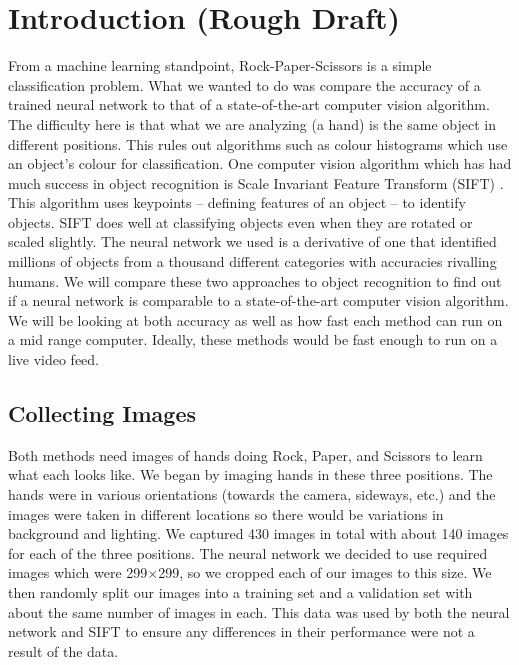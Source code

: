 \section{Introduction (Rough Draft)}

From a machine learning standpoint, Rock-Paper-Scissors is a simple classification problem. What we wanted to do was compare the accuracy of a trained neural network to that of a state-of-the-art computer vision algorithm. The difficulty here is that what we are analyzing (a hand) is the same object in different positions. This rules out algorithms such as colour histograms which use an object's colour for classification. One computer vision algorithm which has had much success in object recognition is Scale Invariant Feature Transform (SIFT) \cite{SIFT}. This algorithm uses keypoints -- defining features of an object -- to identify objects. SIFT does well at classifying objects even when they are rotated or scaled slightly. The neural network we used is a derivative of one that identified millions of objects from a thousand different categories with accuracies rivalling humans. We will compare these two approaches to object recognition to find out if a neural network is comparable to a state-of-the-art computer vision algorithm. We will be looking at both accuracy as well as how fast each method can run on a mid range computer. Ideally, these methods would be fast enough to run on a live video feed.

\subsection{Collecting Images}
Both methods need images of hands doing Rock, Paper, and Scissors to learn what each looks like. We began by imaging hands in these three positions. The hands were in various orientations (towards the camera, sideways, etc.) and the images were taken in different locations so there would be variations in background and lighting. We captured 430 images in total with about 140 images for each of the three positions. The neural network we decided to use required images which were 299$\times$299, so we cropped each of our images to this size. We then randomly split our images into a training set and a validation set with about the same number of images in each. This data was used by both the neural network and SIFT to ensure any differences in their performance were not a result of the data.

